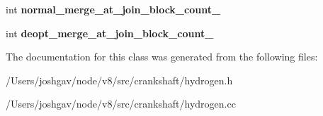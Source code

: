 \begin{DoxyCompactItemize}
\item 
int {\bfseries normal\+\_\+merge\+\_\+at\+\_\+join\+\_\+block\+\_\+count\+\_\+}\hypertarget{classv8_1_1internal_1_1_h_graph_builder_1_1_if_builder_a98cc512f61e99bdf77ad7a73867cf37e}{}\label{classv8_1_1internal_1_1_h_graph_builder_1_1_if_builder_a98cc512f61e99bdf77ad7a73867cf37e}

\item 
int {\bfseries deopt\+\_\+merge\+\_\+at\+\_\+join\+\_\+block\+\_\+count\+\_\+}\hypertarget{classv8_1_1internal_1_1_h_graph_builder_1_1_if_builder_a794e45a64d08ac2fd066ea3123646132}{}\label{classv8_1_1internal_1_1_h_graph_builder_1_1_if_builder_a794e45a64d08ac2fd066ea3123646132}

\end{DoxyCompactItemize}


The documentation for this class was generated from the following files\+:\begin{DoxyCompactItemize}
\item 
/\+Users/joshgav/node/v8/src/crankshaft/hydrogen.\+h\item 
/\+Users/joshgav/node/v8/src/crankshaft/hydrogen.\+cc\end{DoxyCompactItemize}

